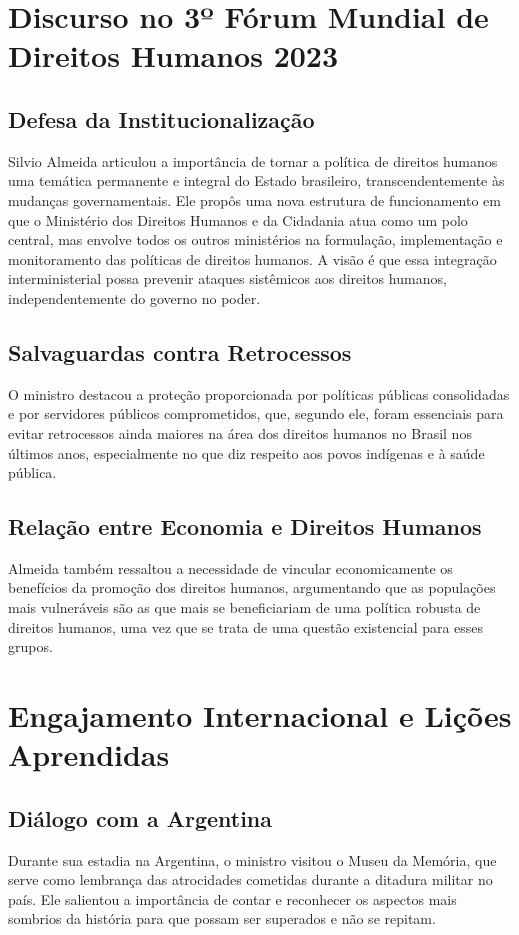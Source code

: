 \documentclass[
   article,       
   12pt,          
   oneside,       
   a4paper,       
   english,       
   brazil,        
   sumario=tradicional
   ]{abntex2}
\begin{document}
\section{Discurso no 3º Fórum Mundial de Direitos Humanos 2023}
\subsection{Defesa da Institucionalização}
Silvio Almeida articulou a importância de tornar a política de direitos humanos uma temática permanente e integral do Estado brasileiro, transcendentemente às mudanças governamentais. Ele propôs uma nova estrutura de funcionamento em que o Ministério dos Direitos Humanos e da Cidadania atua como um polo central, mas envolve todos os outros ministérios na formulação, implementação e monitoramento das políticas de direitos humanos. A visão é que essa integração interministerial possa prevenir ataques sistêmicos aos direitos humanos, independentemente do governo no poder.

\subsection{Salvaguardas contra Retrocessos}
O ministro destacou a proteção proporcionada por políticas públicas consolidadas e por servidores públicos comprometidos, que, segundo ele, foram essenciais para evitar retrocessos ainda maiores na área dos direitos humanos no Brasil nos últimos anos, especialmente no que diz respeito aos povos indígenas e à saúde pública.

\subsection{Relação entre Economia e Direitos Humanos}
Almeida também ressaltou a necessidade de vincular economicamente os benefícios da promoção dos direitos humanos, argumentando que as populações mais vulneráveis são as que mais se beneficiariam de uma política robusta de direitos humanos, uma vez que se trata de uma questão existencial para esses grupos. 

\section{Engajamento Internacional e Lições Aprendidas}
\subsection{Diálogo com a Argentina}
Durante sua estadia na Argentina, o ministro visitou o Museu da Memória, que serve como lembrança das atrocidades cometidas durante a ditadura militar no país. Ele salientou a importância de contar e reconhecer os aspectos mais sombrios da história para que possam ser superados e não se repitam. 
\end{document}
